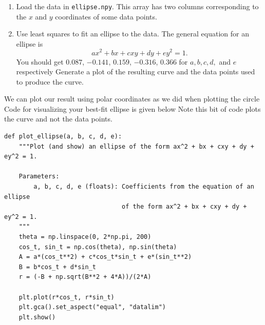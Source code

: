 \begin{problem}
\leavevmode
\begin{enumerate}
\item Load the data in \texttt{ellipse.npy}.
This array has two columns corresponding to the $x$ and $y$ coordinates of some data points.
\item Use least squares to fit an ellipse to the data.
The general equation for an ellipse is
\[
ax^2 + bx + cxy + dy + ey^2 = 1.
\]
You should get  $0.087$, $-0.141$,  $0.159$, $-0.316$, $0.366$ for $a, b, c, d,$ and $e$ respectively
Generate a plot of the resulting curve and the data points used to produce the curve.
\end{enumerate}

We can plot our result using polar coordinates as we did when plotting the circle
Code for visualizing your best-fit ellipse is given below
Note this bit of code plots the curve and not the data points.

\begin{lstlisting}
def plot_ellipse(a, b, c, d, e):
    """Plot (and show) an ellipse of the form ax^2 + bx + cxy + dy + ey^2 = 1.

    Parameters:
        a, b, c, d, e (floats): Coefficients from the equation of an ellipse
                                of the form ax^2 + bx + cxy + dy + ey^2 = 1.
    """
    theta = np.linspace(0, 2*np.pi, 200)
    cos_t, sin_t = np.cos(theta), np.sin(theta)
    A = a*(cos_t**2) + c*cos_t*sin_t + e*(sin_t**2)
    B = b*cos_t + d*sin_t
    r = (-B + np.sqrt(B**2 + 4*A))/(2*A)

    plt.plot(r*cos_t, r*sin_t)
    plt.gca().set_aspect("equal", "datalim")
    plt.show()
\end{lstlisting}

\end{problem}


